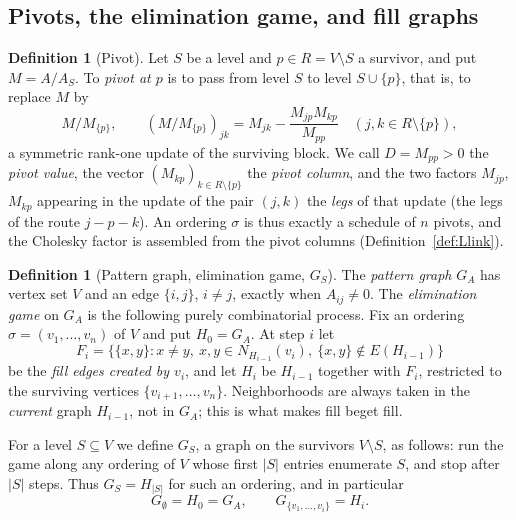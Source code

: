 \documentclass[11pt]{article}
\theoremstyle{plain}
\theoremstyle{definition}
\newtheorem{definition}[theorem]{Definition}
\begin{document}
\begin{humanblock}
\subsection{Pivots, the elimination game, and fill graphs}\label{sec:pivots}

\begin{definition}[Pivot]\label{def:pivot}
Let $S$ be a level and $p\in R=V\setminus S$ a survivor, and put $M=A/A_S$. To \emph{pivot at $p$} is
to pass from level $S$ to level $S\cup\{p\}$, that is, to replace $M$ by
\[
M/M_{\{p\}},\qquad (M/M_{\{p\}})_{jk}=M_{jk}-\frac{M_{jp}M_{kp}}{M_{pp}}
\quad (j,k\in R\setminus\{p\}),
\]
a symmetric rank-one update of the surviving block. We call $D=M_{pp}>0$ the \emph{pivot value}, the
vector $(M_{kp})_{k\in R\setminus\{p\}}$ the \emph{pivot column}, and the two factors $M_{jp}$,
$M_{kp}$ appearing in the update of the pair $(j,k)$ the \emph{legs} of that update (the legs of the
route $j-p-k$). An ordering $\sigma$ is thus exactly a schedule of $n$ pivots, and the Cholesky
factor is assembled from the pivot columns (Definition~\ref{def:Llink}).
\end{definition}

\begin{definition}[Pattern graph, elimination game, $G_S$]\label{def:fill}
The \emph{pattern graph} $G_A$ has vertex set $V$ and an edge $\{i,j\}$, $i\neq j$, exactly when
$A_{ij}\neq0$. The \emph{elimination game} on $G_A$ is the following purely combinatorial process.
Fix an ordering $\sigma=(v_1,\dots,v_n)$ of $V$ and put $H_0=G_A$. At step $i$ let
\[
  F_i=\bigl\{\{x,y\}: x\neq y,\ x,y\in N_{H_{i-1}}(v_i),\ \{x,y\}\notin E(H_{i-1})\bigr\}
\]
be the \emph{fill edges created by $v_i$}, and let $H_i$ be $H_{i-1}$ together with $F_i$, restricted
to the surviving vertices $\{v_{i+1},\dots,v_n\}$. Neighborhoods are always taken in the
\emph{current} graph $H_{i-1}$, not in $G_A$; this is what makes fill beget fill.

For a level $S\subseteq V$ we define $G_S$, a graph on the survivors $V\setminus S$, as follows: run
the game along any ordering of $V$ whose first $|S|$ entries enumerate $S$, and stop after $|S|$
steps. Thus $G_S=H_{|S|}$ for such an ordering, and in particular
\[
  G_\emptyset=H_0=G_A,\qquad G_{\{v_1,\dots,v_i\}}=H_i .
\]

\end{definition}


\end{humanblock}
\end{document}
